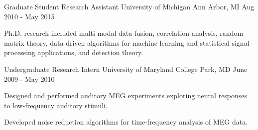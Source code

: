 

\begin{cventries}

  \cventry
    {Graduate Student Research Assistant} %
    {University of Michigan} %
    {Ann Arbor, MI} %
    {Aug 2010 - May 2015} %
    {
      \begin{cvitems} %
      \item {Ph.D. research included multi-modal data fusion, correlation analysis, random
          matrix theory, data driven algorithms for machine learning and statistical
          signal processing applications, and detection theory.}
      \end{cvitems}
    }

  \cventry
    {Undergraduate Research Intern} %
    {University of Maryland} %
    {College Park, MD} %
    {June 2009 - May 2010} %
    {
      \begin{cvitems} %
      \item {Designed and performed auditory MEG experiments exploring neural responses to
          low-frequency auditory stimuli.}
      \item {Developed noise reduction algorithms for time-frequency analysis of MEG data.}
      \end{cvitems}
    }

\end{cventries}
